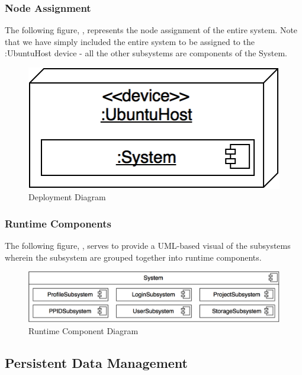 \documentclass[12pt,letterpaper]{article}
\begin{document}
\newpage{}
\subsubsection{Node Assignment}

The following figure, , represents the node assignment of the entire system. Note that we have simply included the entire system to be assigned to the :UbuntuHost device - all the other subsystems are components of the System.

\begin{figure}[H]
	\centering{}
	\includegraphics[scale=0.45]{imgs/d3/decomp/deployment-diagram.png}
	\caption{Deployment Diagram}
\end{figure}

\subsubsection{Runtime Components}

The following figure, , serves to provide a UML-based visual of the subsystems wherein the subsystem are grouped together into runtime components. 


\begin{figure}[H]
	\centering{}
	\includegraphics[scale=0.35]{imgs/d3/decomp/runtime-component-diagram.png}
	\caption{Runtime Component Diagram}
\end{figure}

\subsection{Persistent Data Management}
\end{document}
